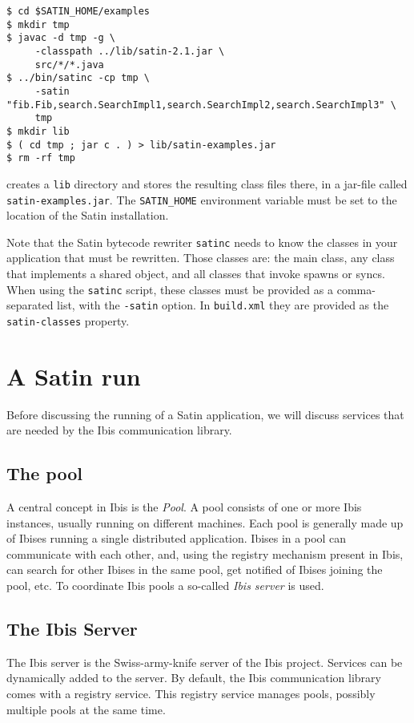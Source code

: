 \documentclass[a4paper,10pt]{article}
\begin{document}
\begin{verbatim}
$ cd $SATIN_HOME/examples
$ mkdir tmp
$ javac -d tmp -g \
     -classpath ../lib/satin-2.1.jar \
     src/*/*.java
$ ../bin/satinc -cp tmp \
     -satin "fib.Fib,search.SearchImpl1,search.SearchImpl2,search.SearchImpl3" \
     tmp
$ mkdir lib
$ ( cd tmp ; jar c . ) > lib/satin-examples.jar
$ rm -rf tmp
\end{verbatim}

creates a \texttt{lib} directory and stores the resulting class files there,
in a jar-file called \texttt{satin-examples.jar}.
The \texttt{SATIN\_HOME} environment variable must be set to the location of
the Satin installation.

Note that the Satin bytecode rewriter \texttt{satinc} needs to know the
classes in your application that must be rewritten.
Those classes are: the main class, any class that implements a shared object,
and all classes that invoke spawns or syncs.
When using the \texttt{satinc} script, these classes must be provided as
a comma-separated list, with the \texttt{-satin} option. In
\texttt{build.xml} they are provided as the \texttt{satin-classes} property.

\section{A Satin run}

Before discussing
the running of a Satin application, we will discuss services that are
needed by the Ibis communication library.

\subsection{The pool}

A central concept in Ibis is the \emph{Pool}. A pool consists of one or
more Ibis instances, usually running on different machines. Each pool is
generally made up of Ibises running a single distributed application.
Ibises in a pool can communicate with each other, and, using the
registry mechanism present in Ibis, can search for other Ibises in the
same pool, get notified of Ibises joining the pool, etc. To
coordinate Ibis pools a so-called \emph{Ibis server} is used.

\subsection{The Ibis Server}

The Ibis server is the Swiss-army-knife server of the Ibis project.
Services can be dynamically added to the server. By default, the Ibis
communication library comes with a registry service. This registry
service manages pools, possibly multiple pools at the same time.
\end{document}
